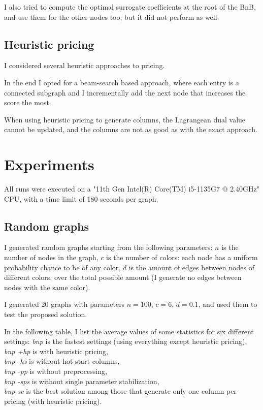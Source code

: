 \documentclass{article}
\begin{document}
I also tried to compute the optimal surrogate coefficients at the root of the BnB,
and use them for the other nodes too, but it did not perform as well.

\subsection{Heuristic pricing}
I considered several heuristic approaches to pricing.

In the end I opted for a beam-search based approach,
where each entry is a connected subgraph and I incrementally add the next node that increases the score the most.

When using heuristic pricing to generate columns, the Lagrangean dual value cannot be updated,
and the columns are not as good as with the exact approach.


\section{Experiments}
All runs were executed on a "11th Gen Intel(R) Core(TM) i5-1135G7 @ 2.40GHz" CPU, with a time limit of 180 seconds per graph.

\subsection{Random graphs}
I generated random graphs starting from the following parameters:
$n$ is the number of nodes in the graph,
$c$ is the number of colors: each node has a uniform probability chance to be of any color,
$d$ is the amount of edges between nodes of different colors, over the total possible amount (I generate no edges between nodes with the same color).

I generated 20 graphs with parameters $n=100$, $c=6$, $d=0.1$,
and used them to test the proposed solution.

In the following table, I list the average values of some statistics for six different settings:
\textit{bnp} is the fastest settings (using everything except heuristic pricing),\\
\textit{bnp +hp} is with heuristic pricing,\\
\textit{bnp -hs} is without hot-start columns,\\
\textit{bnp -pp} is without preprocessing,\\
\textit{bnp -sps} is without single parameter stabilization,\\
\textit{bnp sc} is the best solution among those that generate only one column per pricing (with heuristic pricing).
\end{document}
